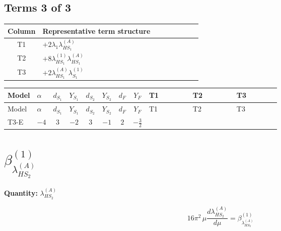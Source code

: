 \documentclass[8pt]{article}
\begin{document}
\begin{landscape}
\subsection*{Terms 3 of 3}
\begin{center}
\begin{tabular}{@{}c >{\raggedright\arraybackslash}p{0.82\linewidth}@{}}
\toprule
Column & Representative term structure \\
\midrule
T1 & \(\displaystyle +2 {\lambda_1} {\lambda_{HS_1}^{(A)}}\) \\
\midrule
T2 & \(\displaystyle +8 {\lambda_{HS_1}^{(1)}} {\lambda_{HS_1}^{(A)}}\) \\
\midrule
T3 & \(\displaystyle +2 {\lambda_{HS_1}^{(A)}} {\lambda_{S_1}^{(1)}}\) \\
\midrule
\bottomrule
\end{tabular}
\end{center}
\smallskip
\tiny
\begin{longtable}{@{}llcccccc >{\raggedright\arraybackslash}p{0.21\linewidth} >{\raggedright\arraybackslash}p{0.21\linewidth} >{\raggedright\arraybackslash}p{0.21\linewidth}@{}}
\toprule
Model & $\alpha$ & $d_{S_1}$ & $Y_{S_1}$ & $d_{S_2}$ & $Y_{S_2}$ & $d_F$ & $Y_F$ & T1 & T2 & T3 \\
\midrule
\endfirsthead
\toprule
Model & $\alpha$ & $d_{S_1}$ & $Y_{S_1}$ & $d_{S_2}$ & $Y_{S_2}$ & $d_F$ & $Y_F$ & T1 & T2 & T3 \\
\midrule
\endhead
T3-E & $-4$ & $3$ & $-2$ & $3$ & $-1$ & $2$ & $-\frac{3}{2}$ & \scriptsize\adjustbox{max width=\linewidth}{$\begin{gathered} +2 {\lambda_1} {\lambda_{HS_1}^{(A)}}\end{gathered}$} & \scriptsize\adjustbox{max width=\linewidth}{$\begin{gathered} +8 {\lambda_{HS_1}^{(1)}} {\lambda_{HS_1}^{(A)}}\end{gathered}$} & \scriptsize\adjustbox{max width=\linewidth}{$\begin{gathered} +2 {\lambda_{HS_1}^{(A)}} {\lambda_{S_1}^{(1)}}\end{gathered}$} \\
\midrule
\bottomrule
\end{longtable}
\clearpage
\section*{$\beta_{\lambda_{HS_2}^{(A)}}^{(1)}$}
\noindent\textbf{Quantity: }$\lambda_{HS_2}^{(A)}$\par\smallskip
\[16\pi^2\,\mu\frac{d \lambda_{HS_2}^{(A)}}{d\mu}=\beta_{\lambda_{HS_2}^{(A)}}^{(1)}\]

\end{landscape}
\end{document}
